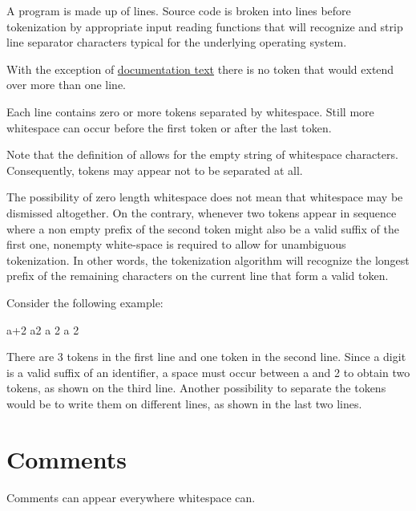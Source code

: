 A program is made up of lines.
Source code is broken into lines before tokenization by appropriate
input reading functions that will recognize and strip line separator
characters typical for the underlying operating system. 

With the exception of \hyperref[doccomment]{documentation text} there is no token that would
extend over more than one line.

Each line contains zero or more tokens separated by whitespace. Still
more whitespace can occur before the first token or after the last
token.

Note that the definition of  allows for the empty
string of whitespace characters. Consequently, tokens may appear not to
be separated at all.

The possibility of zero length whitespace does not mean that whitespace
may be dismissed altogether. On the contrary, whenever two tokens appear
in sequence where a non empty prefix of the second token might also be a
valid suffix of the first one, nonempty white-space is required to allow
for unambiguous tokenization. In other words, the tokenization algorithm
will recognize the longest prefix of the remaining characters on the
current line that form a valid token.

Consider the following example:

\begin{code}
  a+2
  a2
  a 2
  a
    2
\end{code}

There are 3 tokens in the first line and one token in the second line.
Since a digit is a valid suffix of an identifier, a space must occur
between a and 2 to obtain two tokens, as shown on the third line.
Another possibility to separate the tokens would be to write them on
different lines, as shown in the last two lines.

\section{Comments} 

Comments can appear everywhere whitespace can.

\begin{flushleft}
  \oder{} \\
  \\
 \regex{)*-$\backslash$\}}\\
\end{flushleft}

